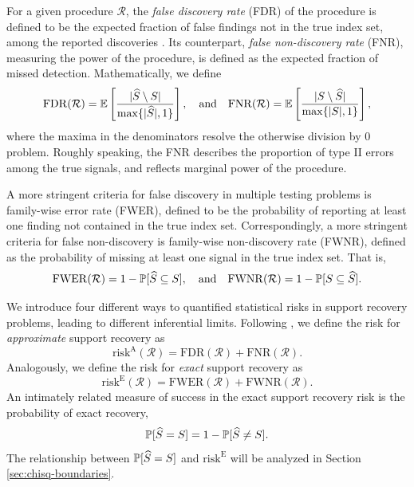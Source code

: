 For a given procedure $\mathcal{R}$, the \emph{false discovery rate} (FDR) of the procedure is defined to be the expected fraction of false findings not in the true index set, among the reported discoveries \cite{benjamini1995controlling}. 
Its counterpart, \emph{false non-discovery rate} (FNR), measuring the power of the procedure, is defined as the expected fraction of missed detection. 
Mathematically, we define
\begin{equation} \label{eq:FDR-FNR}
    \mathrm{FDR}(\mathcal{R}) = \E\left[\frac{|\widehat{S}\setminus S|}{\max\{|\widehat{S}|,1\}}\right],
    \quad \text{and} \quad
    \mathrm{FNR}(\mathcal{R}) = \E\left[\frac{|S\setminus \widehat{S}|}{\max\{|{S}|,1\}}\right],
\end{equation}
where the maxima in the denominators resolve the otherwise division by 0 problem. 
Roughly speaking, the FNR describes the proportion of type II errors among the true signals, and reflects marginal power of the procedure.

A more stringent criteria for false discovery in multiple testing problems is family-wise error rate (FWER), defined to be the probability of reporting at least one finding not contained in the true index set.
Correspondingly, a more stringent criteria for false non-discovery is family-wise non-discovery rate (FWNR), defined as the probability of missing at least one signal in the true index set. That is,
\begin{equation} \label{eq:FWER-FWNR}
    \mathrm{FWER}(\mathcal{R}) = 1 - \P[\widehat{S} \subseteq S], 
    \quad \text{and} \quad
    \mathrm{FWNR}(\mathcal{R}) = 1 - \P[S \subseteq \widehat{S}].
\end{equation}

We introduce four different ways to quantified statistical risks in support recovery problems, leading to different inferential limits. 
Following \cite{arias2017distribution}, we define the risk for \emph{approximate} support recovery as
\begin{equation} \label{eq:risk-approximate}
    \mathrm{risk}^{\mathrm{A}}(\mathcal{R}) = \mathrm{FDR}(\mathcal{R}) + \mathrm{FNR}(\mathcal{R}).
\end{equation}
Analogously, we define the risk for \emph{exact} support recovery as
\begin{equation} \label{eq:risk-exact}
    \mathrm{risk}^{\mathrm{E}}(\mathcal{R}) = \mathrm{FWER}(\mathcal{R}) + \mathrm{FWNR}(\mathcal{R}).
\end{equation}
An intimately related measure of success in the exact support recovery risk is the probability of exact recovery, 
\begin{equation} \label{eq:risk-prob}
    \P[\widehat{S} = S] = 1 - \P[\widehat{S} \neq S].
\end{equation}
The relationship between $\P[\widehat{S} = S]$ and $\mathrm{risk}^{\mathrm{E}}$ will be analyzed in Section \ref{sec:chisq-boundaries}.

